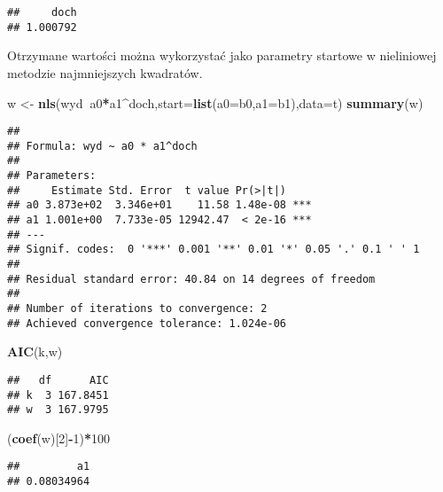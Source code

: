 \documentclass[polish,]{book}
\newenvironment{Shaded}{\begin{snugshade}}{\end{snugshade}}
\newcommand{\DataTypeTok}[1]{\textcolor[rgb]{0.13,0.29,0.53}{#1}}
\newcommand{\DecValTok}[1]{\textcolor[rgb]{0.00,0.00,0.81}{#1}}
\newcommand{\KeywordTok}[1]{\textcolor[rgb]{0.13,0.29,0.53}{\textbf{#1}}}
\newcommand{\NormalTok}[1]{#1}
\newcommand{\OperatorTok}[1]{\textcolor[rgb]{0.81,0.36,0.00}{\textbf{#1}}}
\newcommand{\StringTok}[1]{\textcolor[rgb]{0.31,0.60,0.02}{#1}}
\begin{document}
\begin{verbatim}
##     doch 
## 1.000792
\end{verbatim}

Otrzymane wartości można wykorzystać jako parametry startowe w nieliniowej metodzie najmniejszych kwadratów.

\begin{Shaded}
\begin{Highlighting}[]
\NormalTok{w <-}\StringTok{ }\KeywordTok{nls}\NormalTok{(wyd}\OperatorTok{~}\NormalTok{a0}\OperatorTok{*}\NormalTok{a1}\OperatorTok{^}\NormalTok{doch,}\DataTypeTok{start=}\KeywordTok{list}\NormalTok{(}\DataTypeTok{a0=}\NormalTok{b0,}\DataTypeTok{a1=}\NormalTok{b1),}\DataTypeTok{data=}\NormalTok{t)}
\KeywordTok{summary}\NormalTok{(w)}
\end{Highlighting}
\end{Shaded}

\begin{verbatim}
## 
## Formula: wyd ~ a0 * a1^doch
## 
## Parameters:
##     Estimate Std. Error  t value Pr(>|t|)    
## a0 3.873e+02  3.346e+01    11.58 1.48e-08 ***
## a1 1.001e+00  7.733e-05 12942.47  < 2e-16 ***
## ---
## Signif. codes:  0 '***' 0.001 '**' 0.01 '*' 0.05 '.' 0.1 ' ' 1
## 
## Residual standard error: 40.84 on 14 degrees of freedom
## 
## Number of iterations to convergence: 2 
## Achieved convergence tolerance: 1.024e-06
\end{verbatim}

\begin{Shaded}
\begin{Highlighting}[]
\KeywordTok{AIC}\NormalTok{(k,w)}
\end{Highlighting}
\end{Shaded}

\begin{verbatim}
##   df      AIC
## k  3 167.8451
## w  3 167.9795
\end{verbatim}

\begin{Shaded}
\begin{Highlighting}[]
\NormalTok{(}\KeywordTok{coef}\NormalTok{(w)[}\DecValTok{2}\NormalTok{]}\OperatorTok{-}\DecValTok{1}\NormalTok{)}\OperatorTok{*}\DecValTok{100}
\end{Highlighting}
\end{Shaded}

\begin{verbatim}
##         a1 
## 0.08034964
\end{verbatim}
\end{document}
